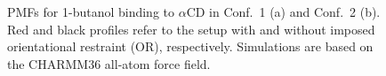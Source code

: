 \documentclass[9pt,lessons,pubversion]{livecoms}
\begin{document}
\begin{figure}[htp]
  \centering
  \quad
  \caption{PMFs for 1-butanol binding to $\alpha$CD in Conf.~1 (a) and Conf.~2 (b).
  Red and black profiles refer to the setup with and without imposed orientational restraint (OR), respectively. 
  Simulations are based on the CHARMM36 all-atom force field.
  }
  \label{fig:PMF_aCD_CHARMM}
\end{figure}
\end{document}
